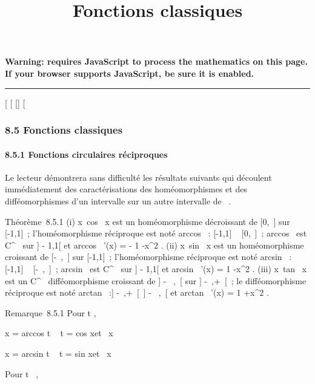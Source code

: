 \documentclass[]{article}
\title{Fonctions classiques}
\author{}
\date{}
\begin{document}
\maketitle

\textbf{Warning: 
requires JavaScript to process the mathematics on this page.\\ If your
browser supports JavaScript, be sure it is enabled.}

\begin{center}\rule{3in}{0.4pt}\end{center}

[
[
[]
[

\subsubsection{8.5 Fonctions classiques}

\paragraph{8.5.1 Fonctions circulaires réciproques}

Le lecteur démontrera sans difficulté les résultats suivants qui
découlent immédiatement des caractérisations des homéomorphismes et des
difféomorphismes d'un intervalle sur un autre intervalle de ~.

Théorème~8.5.1 (i)
x\mapsto~cos~ x est un
homéomorphisme décroissant de [0,\pi~] sur [-1,1]~;
l'homéomorphisme réciproque est noté arccos~ :
[-1,1] \rightarrow~ [0,\pi~]~; arccos~ est
C^\infty~ sur ] - 1,1[ et arccos~ '(x)
= - 1 \over {}-x^2
. (ii) x\mapsto~sin~ x est
un homéomorphisme croissant de [-\pi~,\pi~] sur [-1,1]~;
l'homéomorphisme réciproque est noté arcsin~ :
[-1,1] \rightarrow~ [-\pi~,\pi~]~; arcsin~ est
C^\infty~ sur ] - 1,1[ et arcsin~ '(x)
= 1 \over {}-x^2 .
(iii) x\mapsto~tan~ x est
un C^\infty~ difféomorphisme croissant de ] - \pi~,\pi~[ sur ]
-\infty~,+\infty~[~; le difféomorphisme réciproque est noté
arctan~ :] -\infty~,+\infty~[\rightarrow~] - \pi~,\pi~[ et
arctan~ '(x) = 1 +x^2 .

Remarque~8.5.1 Pour t \in [-1,1],

x = arccos t \mathrel\Leftrightarrow~ t
= cos x\text et ~x \in
[0,\pi~]

x = arcsin t \mathrel\Leftrightarrow~ t
= sin x\text et ~x 

Pour t \in {}~,
\end{document}
